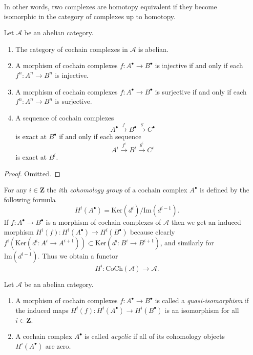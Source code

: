 \noindent
In other words, two complexes are homotopy equivalent if they become
isomorphic in the category of complexes up to homotopy.

\begin{lemma}
\label{lemma-cat-cochain-abelian}
Let $\mathcal{A}$ be an abelian category.
\begin{enumerate}
\item The category of cochain complexes in $\mathcal{A}$ is
abelian.
\item A morphism of cochain complexes
$f : A^\bullet \to B^\bullet$ is injective
if and only if each $f^n : A^n \to B^n$ is injective.
\item A morphism of cochain complexes
$f : A^\bullet \to B^\bullet$ is surjective
if and only if each $f^n : A^n \to B^n$ is surjective.
\item A sequence of cochain complexes
$$
A^\bullet \xrightarrow{f} B^\bullet \xrightarrow{g} C^\bullet
$$
is exact at $B^\bullet$ if and only if each sequence
$$
A^i \xrightarrow{f^i} B^i \xrightarrow{g^i} C^i
$$
is exact at $B^i$.
\end{enumerate}
\end{lemma}

\begin{proof}
Omitted.
\end{proof}

\noindent
For any $i \in \mathbf{Z}$ the $i$th {\it cohomology group}
of a cochain complex $A^\bullet$ is defined by
the following formula
$$
H^i(A^\bullet) = \text{Ker}(d^i)/\text{Im}(d^{i - 1}).
$$
If $f : A^\bullet \to B^\bullet$ is a morphism of cochain
complexes of $\mathcal{A}$ then we get an induced
morphism $H^i(f) : H^i(A^\bullet) \to H^i(B^\bullet)$
because clearly
$f^i(\text{Ker}(d^i : A^i \to A^{i + 1})) \subset
\text{Ker}(d^i : B^i \to B^{i + 1})$, and similarly
for $\text{Im}(d^{i - 1})$.
Thus we obtain a functor
$$
H^i : \text{CoCh}(\mathcal{A}) \longrightarrow \mathcal{A}.
$$

\begin{definition}
\label{definition-quasi-isomorphism-cochain}
Let $\mathcal{A}$ be an abelian category.
\begin{enumerate}
\item A morphism of cochain complexes $f : A^\bullet \to B^\bullet$
is called a {\it quasi-isomorphism} if the induced
maps $H^i(f) : H^i(A^\bullet) \to H^i(B^\bullet)$
is an isomorphism for all $i \in \mathbf{Z}$.
\item A cochain complex $A^\bullet$ is called
{\it acyclic} if all of its cohomology objects
$H^i(A^\bullet)$ are zero.
\end{enumerate}
\end{definition}

